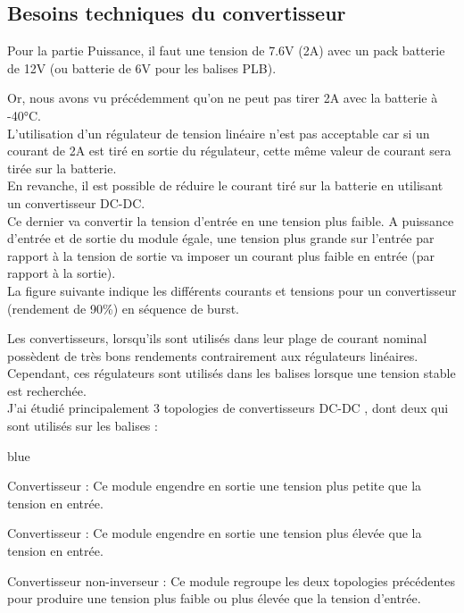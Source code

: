 \subsection{Besoins techniques du convertisseur}


Pour la partie Puissance, il faut une tension de 7.6V (2A) avec un pack batterie de 12V (ou batterie de 6V pour les balises PLB). 

Or, nous avons vu précédemment qu'on ne peut pas tirer 2A avec la batterie à -40°C.\\
L'utilisation d'un régulateur de tension linéaire n'est pas acceptable car si un courant de 2A est tiré en sortie du régulateur, cette même valeur de courant sera tirée sur la batterie.\\

En revanche, il est possible de réduire le courant tiré sur la batterie en utilisant un convertisseur DC-DC.\\ Ce dernier va convertir la tension d'entrée en une tension plus faible. A puissance d'entrée et de sortie du module égale, une tension plus grande sur l'entrée par rapport à la tension de sortie va imposer un courant plus faible en entrée (par rapport à la sortie).\\
La figure suivante indique les différents courants et tensions pour un convertisseur (rendement de 90\%) en séquence de burst.\\




Les convertisseurs, lorsqu'ils sont utilisés dans leur plage de courant nominal possèdent de très bons rendements contrairement aux régulateurs linéaires. Cependant, ces régulateurs sont utilisés dans les balises lorsque une tension stable est recherchée.\\


J'ai étudié principalement 3 topologies de convertisseurs DC-DC , dont deux qui sont utilisés sur les balises :

\begin{items}{blue}{\Triangle}
    \item Convertisseur  : Ce module engendre en sortie une tension plus petite que la tension en entrée.
    \item Convertisseur  : Ce module engendre en sortie une tension plus élevée que la tension en entrée.
    \item Convertisseur  non-inverseur : Ce module regroupe les deux topologies précédentes pour produire une tension plus faible ou plus élevée que la tension d'entrée.
\end{items}


